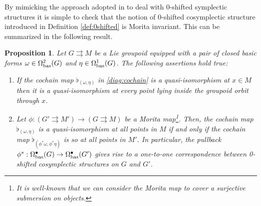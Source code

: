 \documentclass[
  a4paper, 
  reqno, 
  oneside, 
  12pt
]{amsart}
\newtheorem{proposition}[theorem]{Proposition}
\theoremstyle{definition}
\theoremstyle{remark}
\newcommand{\rr}{\rightrightarrows}
\begin{document}
By mimicking the approach adopted in \cite{Maglio} to deal with 0-shifted symplectic structures it is simple to check that the notion of 0-shifted cosymplectic structure introduced in Definition \ref{def:0shifted} is Morita invariant. This can be summarized in the following result.

\begin{proposition}\label{Prop: Morita invariance}
	Let $G\rr M$ be a Lie groupoid equipped with a pair of closed basic forms $\omega\in \Omega_{\textnormal{bas}}^2(G)$ and $\eta\in \Omega_{\textnormal{bas}}^1(G)$. The following assertions hold true:
	\begin{enumerate}
		\item If the cochain map $\flat_{(\omega,\eta)}$ in \eqref{diag:cochain} is a quasi-isomorphism at $x\in M$ then it is a quasi-isomorphism at every point lying inside the groupoid orbit through $x$.
		\item Let $\phi:(G'\rr M')\to (G\rr M)$ be a Morita map\footnote{It is well-known that we can consider the Morita map to cover a surjective submersion on objects.}. Then, the cochain map $\flat_{(\omega,\eta)}$ is a quasi-isomorphism at all points in $M$ if and only if the cochain map $\flat_{(\phi^\ast \omega,\phi^\ast \eta)}$ is so at all points in $M'$. In particular, the pullback $\phi^\ast: \Omega_{\textnormal{bas}}^\bullet(G)\to \Omega_{\textnormal{bas}}^\bullet(G')$ gives rise to a one-to-one correspondence between 0-shifted cosymplectic structures on $G$ and $G'$.
	\end{enumerate}
\end{proposition}
\end{document}
